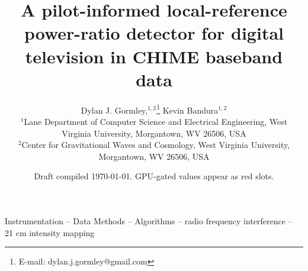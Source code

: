 \documentclass[fleqn,usenatbib]{mnras}
\title[A pilot-informed F-statistic DTV detector for CHIME]{A
pilot-informed local-reference power-ratio detector for digital television in CHIME
baseband data}
\author[D. J. Gormley and K. Bandura]{Dylan J. Gormley,$^{1,2}$\thanks{E-mail:
dylan.j.gormley@gmail.com}
Kevin Bandura$^{1,2}$
\\
$^{1}$Lane Department of Computer Science and Electrical Engineering,
West Virginia University, Morgantown, WV 26506, USA\\
$^{2}$Center for Gravitational Waves and Cosmology, West Virginia
University, Morgantown, WV 26506, USA
}
\date{Draft compiled \today. GPU-gated values appear as red slots.}
\begin{document}
\label{firstpage}
\maketitle

\begin{abstract}

\end{abstract}

\begin{keywords}
Instrumentation -- Data Methods -- Algorithms -- radio frequency
interference -- 21 cm intensity mapping
\end{keywords}





\appendix


\label{lastpage}
\end{document}
